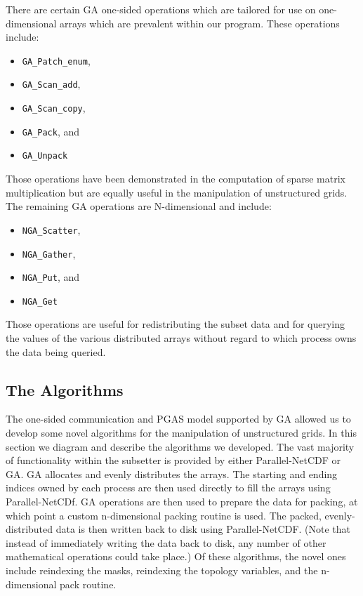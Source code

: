 There are certain GA one-sided operations which are tailored for use on
one-dimensional arrays which are prevalent within our program.  These
operations include:

\begin{itemize}
\item \verb=GA_Patch_enum=,
\item \verb=GA_Scan_add=,
\item \verb=GA_Scan_copy=,
\item \verb=GA_Pack=, and
\item \verb=GA_Unpack=
\end{itemize}

Those operations have been demonstrated in the computation of sparse matrix
multiplication\cite{GA} but are equally useful in the manipulation of
unstructured grids.  The remaining GA operations are N-dimensional and
include:

\begin{itemize}
\item \verb=NGA_Scatter=,
\item \verb=NGA_Gather=,
\item \verb=NGA_Put=, and
\item \verb=NGA_Get=
\end{itemize}

Those operations are useful for redistributing the subset data and for
querying the values of the various distributed arrays without regard to which
process owns the data being queried.

\subsection{The Algorithms}

The one-sided communication and PGAS model supported by GA allowed us to
develop some novel algorithms for the manipulation of unstructured grids.  In
this section we diagram and describe the algorithms we developed.  The vast
majority of functionality within the subsetter is provided by either
Parallel-NetCDF or GA.  GA allocates and evenly distributes the arrays.  The
starting and ending indices owned by each process are then used directly to
fill the arrays using Parallel-NetCDf.  GA operations are then used to prepare
the data for packing, at which point a custom n-dimensional packing routine is
used.  The packed, evenly-distributed data is then written back to disk using
Parallel-NetCDF.  (Note that instead of immediately writing the data back to
disk, any number of other mathematical operations could take place.)  Of these
algorithms, the novel ones include reindexing the masks, reindexing the
topology variables, and the n-dimensional pack routine.

